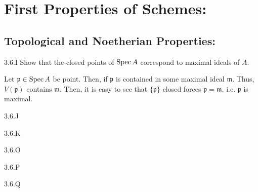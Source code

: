 
\section{First Properties of Schemes:}

\subsection{Topological and Noetherian Properties:}

\begin{exercise}{3.6.I}
    Show that the closed points of $\operatorname{Spec} A$ correspond to maximal ideals of $A$. 
\end{exercise}
\begin{solution}
    Let $\mathfrak{p} \in \operatorname{Spec} A$ be point. Then, if $\mathfrak p$ is contained in some maximal ideal $\mathfrak m$. Thus, $V(\mathfrak{p})$ contains $\mathfrak m$. Then, it is easy to see that $\{\mathfrak p\}$ closed forces $\mathfrak p = \mathfrak m$, i.e. $\mathfrak p$ is maximal.
\end{solution}

\begin{exercise}{3.6.J}

\end{exercise}
\begin{solution}
    \todo{}
\end{solution}

\begin{exercise}{3.6.K}

\end{exercise}
\begin{solution}
    \todo{}
\end{solution}


\begin{exercise}{3.6.O}

\end{exercise}
\begin{solution}
    \todo{}
\end{solution}

\begin{exercise}{3.6.P}

\end{exercise}
\begin{solution}
    \todo{}
\end{solution}

\begin{exercise}{3.6.Q}

\end{exercise}
\begin{solution}
    \todo{}
\end{solution}


